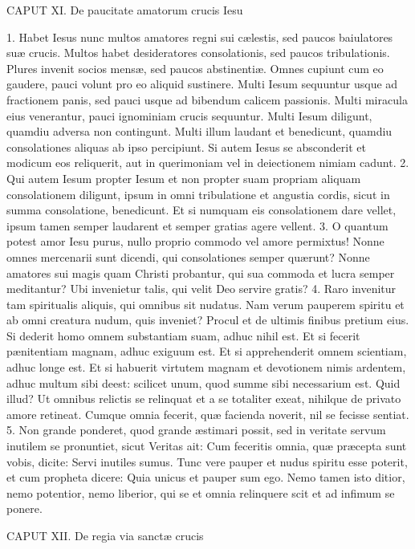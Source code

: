 CAPUT XI.
De paucitate amatorum crucis Iesu

1. Habet Iesus nunc multos amatores regni sui cælestis, sed paucos baiulatores suæ crucis. Multos habet desideratores consolationis, sed paucos tribulationis. Plures invenit socios mensæ, sed paucos abstinentiæ. Omnes cupiunt cum eo gaudere, pauci volunt pro eo aliquid sustinere. Multi Iesum sequuntur usque ad fractionem panis, sed pauci usque ad bibendum calicem passionis. Multi miracula eius venerantur, pauci ignominiam crucis sequuntur. Multi Iesum diligunt, quamdiu adversa non contingunt. Multi illum laudant et benedicunt, quamdiu consolationes aliquas ab ipso percipiunt. Si autem Iesus se absconderit et modicum eos reliquerit, aut in querimoniam vel in deiectionem nimiam cadunt.
2. Qui autem Iesum propter Iesum et non propter suam propriam aliquam consolationem diligunt, ipsum in omni tribulatione et angustia cordis, sicut in summa consolatione, benedicunt. Et si numquam eis consolationem dare vellet, ipsum tamen semper laudarent et semper gratias agere vellent.
3. O quantum potest amor Iesu purus, nullo proprio commodo vel amore permixtus! Nonne omnes mercenarii sunt dicendi, qui consolationes semper quærunt? Nonne amatores sui magis quam Christi probantur, qui sua commoda et lucra semper meditantur? Ubi invenietur talis, qui velit Deo servire gratis?
4. Raro invenitur tam spiritualis aliquis, qui omnibus sit nudatus. Nam verum pauperem spiritu et ab omni creatura nudum, quis inveniet? Procul et de ultimis finibus pretium eius. Si dederit homo omnem substantiam suam, adhuc nihil est. Et si fecerit pænitentiam magnam, adhuc exiguum est. Et si apprehenderit omnem scientiam, adhuc longe est. Et si habuerit virtutem magnam et devotionem nimis ardentem, adhuc multum sibi deest: scilicet unum, quod summe sibi necessarium est. Quid illud? Ut omnibus relictis se relinquat et a se totaliter exeat, nihilque de privato amore retineat. Cumque omnia fecerit, quæ facienda noverit, nil se fecisse sentiat.
5. Non grande ponderet, quod grande æstimari possit, sed in veritate servum inutilem se pronuntiet, sicut Veritas ait: Cum feceritis omnia, quæ præcepta sunt vobis, dicite: Servi inutiles sumus. Tunc vere pauper et nudus spiritu esse poterit, et cum propheta dicere: Quia unicus et pauper sum ego. Nemo tamen isto ditior, nemo potentior, nemo liberior, qui se et omnia relinquere scit et ad infimum se ponere.


CAPUT XII.
De regia via sanctæ crucis

